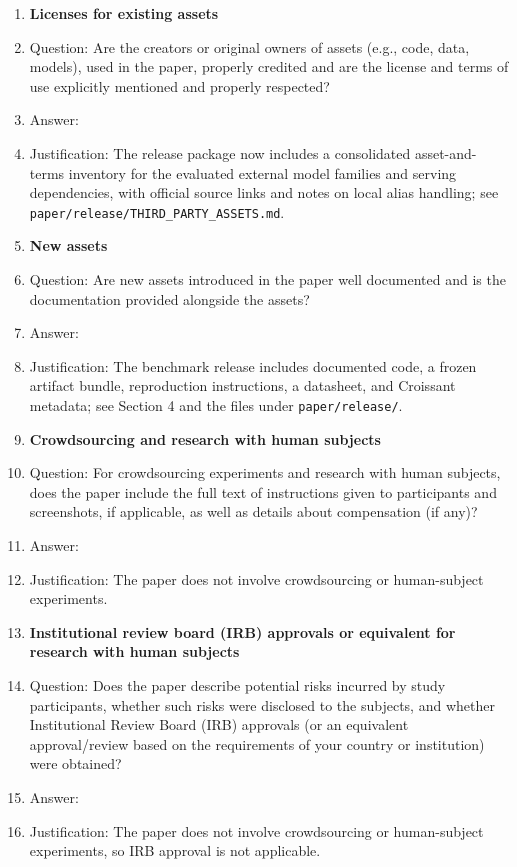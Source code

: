 \begin{enumerate}
\item {\bf Licenses for existing assets}
    \item[] Question: Are the creators or original owners of assets (e.g., code, data, models), used in the paper, properly credited and are the license and terms of use explicitly mentioned and properly respected?
    \item[] Answer: \answerYes{}
    \item[] Justification: The release package now includes a consolidated asset-and-terms inventory for the evaluated external model families and serving dependencies, with official source links and notes on local alias handling; see \texttt{paper/release/THIRD\_PARTY\_ASSETS.md}.

\item {\bf New assets}
    \item[] Question: Are new assets introduced in the paper well documented and is the documentation provided alongside the assets?
    \item[] Answer: \answerYes{}
    \item[] Justification: The benchmark release includes documented code, a frozen artifact bundle, reproduction instructions, a datasheet, and Croissant metadata; see Section 4 and the files under \texttt{paper/release/}.

\item {\bf Crowdsourcing and research with human subjects}
    \item[] Question: For crowdsourcing experiments and research with human subjects, does the paper include the full text of instructions given to participants and screenshots, if applicable, as well as details about compensation (if any)?
    \item[] Answer: \answerNA{}
    \item[] Justification: The paper does not involve crowdsourcing or human-subject experiments.

\item {\bf Institutional review board (IRB) approvals or equivalent for research with human subjects}
    \item[] Question: Does the paper describe potential risks incurred by study participants, whether such risks were disclosed to the subjects, and whether Institutional Review Board (IRB) approvals (or an equivalent approval/review based on the requirements of your country or institution) were obtained?
    \item[] Answer: \answerNA{}
    \item[] Justification: The paper does not involve crowdsourcing or human-subject experiments, so IRB approval is not applicable.


\end{enumerate}
